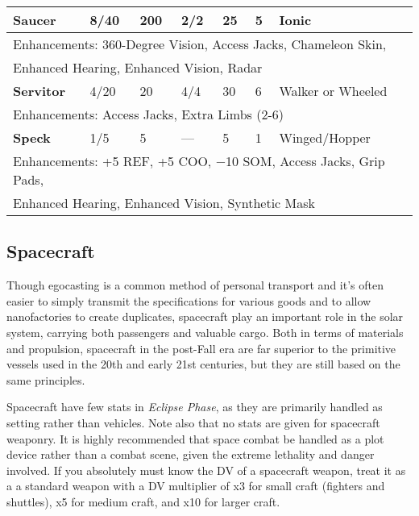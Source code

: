 {{\begin{table}
\begin{tabular}{|l|l|l|l|l|l|l|}
\textbf{Saucer}	&8/40	&200	&2/2	&25	&5	&Ionic \\ \hline

\multicolumn{7}{|l|}{Enhancements: 360-Degree Vision, Access Jacks, Chameleon Skin, } \\ \multicolumn{7}{|l|}{Enhanced Hearing, Enhanced Vision, Radar} \\ \hline

\textbf{Servitor}	&4/20	&20	&4/4	&30	&6	&Walker or Wheeled \\ \hline

\multicolumn{7}{|l|}{Enhancements: Access Jacks, Extra Limbs (2-6)} \\ \hline

\textbf{Speck}	&1/5	&5	&--- &5	&1	&Winged/Hopper \\ \hline

\multicolumn{7}{|l|}{Enhancements: +5 REF, +5 COO, $-$10 SOM, Access Jacks, Grip Pads, } \\ \multicolumn{7}{|l|}{Enhanced Hearing, Enhanced Vision, Synthetic Mask} \\ \hline

\end{tabular} \label{tab:robots} \end{table} 

\subsection{Spacecraft} \label{sec:spacecraft} 

Though egocasting is a common method of personal transport and it’s often easier to simply transmit the specifications for various goods and to allow nanofactories to create duplicates, spacecraft play an important role in the solar system, carrying both passengers and valuable cargo. Both in terms of materials and propulsion, spacecraft in the post-Fall era are far superior to the primitive vessels used in the 20th and early 21st centuries, but they are still based on the same principles. 

Spacecraft have few stats in \emph{Eclipse Phase}, as they are primarily handled as setting rather than vehicles. Note also that no stats are given for spacecraft weaponry. It is highly recommended that space combat be handled as a plot device rather than a combat scene, given the extreme lethality and danger involved. If you absolutely must know the DV of a spacecraft weapon, treat it as a a standard weapon with a DV multiplier of x3 for small craft (fighters and shuttles), x5 for medium craft, and x10 for larger craft. 

}}
